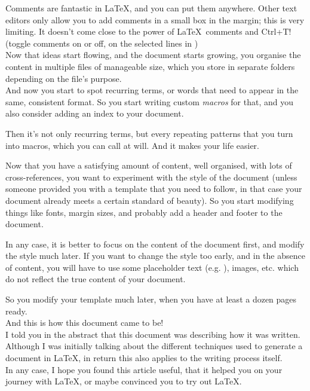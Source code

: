 Comments are fantastic in \LaTeX, and you can put them anywhere. Other text editors only allow you to add comments in a small box in the margin; this is very limiting. It doesn't come close to the power of \LaTeX\ comments and Ctrl+T! (toggle comments on or off, on the selected lines in \TeXstudio) \\

Now that ideas start flowing, and the document starts growing, you organise the content in multiple files of manageable size, which you store in separate folders depending on the file's purpose. \\

And now you start to spot recurring terms, or words that need to appear in the same, consistent format. So you start writing custom \emph{macros} for that, and you also consider adding an index to your document.

Then it's not only recurring terms, but every repeating patterns that you turn into macros, which you can call at will. And it makes your life easier. \\

\newpage

Now that you have a satisfying amount of content, well organised, with lots of cross-references, you want to experiment with the style of the document (unless someone provided you with a template that you need to follow, in that case your document already meets a certain standard of beauty). So you start modifying things like fonts, margin sizes, and probably add a header and footer to the document. 

In any case, it is better to focus on the content of the document first, and modify the style much later. If you want to change the style too early, and in the absence of content, you will have to use some placeholder text (e.g. \LoremIpsum), images, etc. which do not reflect the true content of your document.

So you modify your template much later, when you have at least a dozen pages ready.
\\

And this is how this document came to be! \\

I told you in the abstract that this document was describing how it was written. Although I was initially talking about the different techniques used to generate a document in \LaTeX, in return this also applies to the writing process itself. \\

In any case, I hope you found this article useful, that it helped you on your journey with \LaTeX, or maybe convinced you to try out \LaTeX.